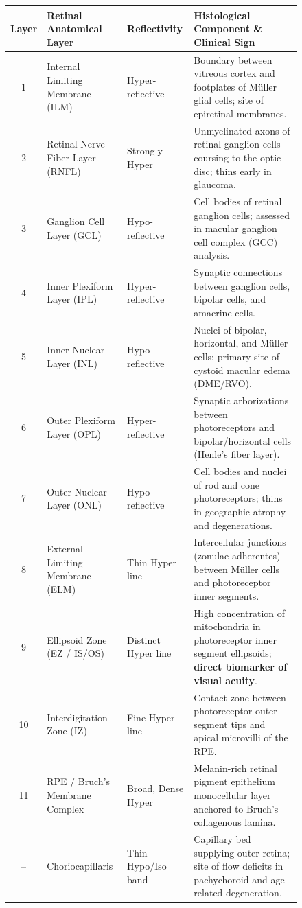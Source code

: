 \documentclass[11pt,a4paper]{article}
\begin{document}
\begin{figure}[htbp]
\centering
\small
\begin{tabular}{cllp{7.2cm}}
\toprule
\textbf{Layer} & \textbf{Retinal Anatomical Layer} & \textbf{Reflectivity} & \textbf{Histological Component \& Clinical Sign} \\
\midrule
1 & Internal Limiting Membrane (ILM) & Hyper-reflective & Boundary between vitreous cortex and footplates of Müller glial cells; site of epiretinal membranes. \\
2 & Retinal Nerve Fiber Layer (RNFL) & Strongly Hyper & Unmyelinated axons of retinal ganglion cells coursing to the optic disc; thins early in glaucoma. \\
3 & Ganglion Cell Layer (GCL) & Hypo-reflective & Cell bodies of retinal ganglion cells; assessed in macular ganglion cell complex (GCC) analysis. \\
4 & Inner Plexiform Layer (IPL) & Hyper-reflective & Synaptic connections between ganglion cells, bipolar cells, and amacrine cells. \\
5 & Inner Nuclear Layer (INL) & Hypo-reflective & Nuclei of bipolar, horizontal, and Müller cells; primary site of cystoid macular edema (DME/RVO). \\
6 & Outer Plexiform Layer (OPL) & Hyper-reflective & Synaptic arborizations between photoreceptors and bipolar/horizontal cells (Henle's fiber layer). \\
7 & Outer Nuclear Layer (ONL) & Hypo-reflective & Cell bodies and nuclei of rod and cone photoreceptors; thins in geographic atrophy and degenerations. \\
8 & External Limiting Membrane (ELM) & Thin Hyper line & Intercellular junctions (zonulae adherentes) between Müller cells and photoreceptor inner segments. \\
9 & Ellipsoid Zone (EZ / IS/OS) & Distinct Hyper line & High concentration of mitochondria in photoreceptor inner segment ellipsoids; \textbf{direct biomarker of visual acuity}. \\
10 & Interdigitation Zone (IZ) & Fine Hyper line & Contact zone between photoreceptor outer segment tips and apical microvilli of the RPE. \\
11 & RPE / Bruch's Membrane Complex & Broad, Dense Hyper & Melanin-rich retinal pigment epithelium monocellular layer anchored to Bruch's collagenous lamina. \\
\midrule
-- & Choriocapillaris & Thin Hypo/Iso band & Capillary bed supplying outer retina; site of flow deficits in pachychoroid and age-related degeneration. \\

\end{tabular}
\end{figure}
\end{document}

